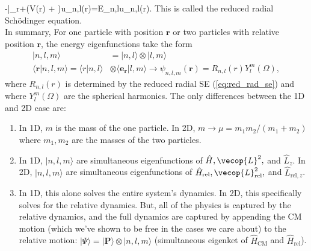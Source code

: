 \be
	-\bigg|_{r}+\left(V(r) + \right)u_{n,l}(r)=E_{n,l}u_{n,l}(r)\label{eq:red_rad_se}.
\ee
This is called the reduced radial Sch{\"o}dinger equation.\\

In summary, For one particle with position $\mathbf{r}$ or two particles with relative position $\mathbf{r}$, the energy eigenfunctions take the form
\begin{align*}
    |n,l,m\rangle&=|n,l\rangle\otimes|l,m\rangle\\
    \langle\mathbf{r}|n,l,m\rangle = \langle r|n,l\rangle&\otimes \langle \mathbf{e}_\mathbf{r}|l,m\rangle\rightarrow \psi_{n,l,m}(\mathbf{r})=R_{n,l}(r)Y^m_l(\Omega),
\end{align*}
where $R_{n,l}(r)$ is determined by the reduced radial SE (\cref{eq:red_rad_se}) and where $Y^m_l(\Omega)$ are the spherical harmonics. The only differences between the 1D and 2D case are:
\begin{enumerate}
    \item In 1D, $m$ is the mass of the one particle. In 2D, $m\rightarrow\mu=m_1m_2/(m_1+m_2)$ where $m_1, m_2$ are the masses of the two particles.
    \item In 1D, $|n,l,m\rangle$ are simultaneous eigenfunctions of $\hat{H},\vecop{L}^2,$ and $\hat{L}_z$. In 2D, $|n,l,m\rangle$ are simultaneous eigenfunctions of $\hat{H}_\text{rel},\vecop{L}^2_\text{rel},$ and $\hat{L}_{\text{rel},z}$.
    \item In 1D, this alone solves the entire system's dynamics. In 2D, this specifically solves for the relative dynamics. But, all of the physics is captured by the relative dynamics, and the full dynamics are captured by appending the CM motion (which we've shown to be free in the cases we care about) to the relative motion: $|\Psi\rangle=|\mathbf{P}\rangle\otimes|n,l,m\rangle$ (simultaneous eigenket of $\hat{H}_\text{CM}$ and $\hat{H}_\text{rel}$).
\end{enumerate}